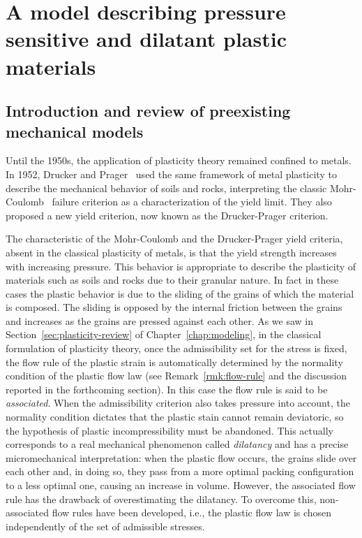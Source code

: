 \documentclass[a4paper,10pt,oneside]{amsbook}
\numberwithin{section}{chapter}
\numberwithin{equation}{chapter}
\theoremstyle{definition}
\begin{document}
\part{A model describing pressure sensitive and dilatant plastic materials}
\label{part:my-model}

\chapter{Introduction and review of preexisting mechanical models}
\label{chap:intro-pressure-sensitive}

Until the 1950s, the application of plasticity theory remained confined to metals. In 1952, Drucker and Prager~\cite{DruckerPrager1952} used the same framework of metal plasticity to describe the mechanical behavior of soils and rocks, interpreting the classic Mohr-Coulomb~\cite{Coulomb1776,Mohr1900} failure criterion as a characterization of the yield limit. They also proposed a new yield criterion, now known as the Drucker-Prager criterion.

The characteristic of the Mohr-Coulomb and the Drucker-Prager yield criteria, absent in the classical plasticity of metals, is that the yield strength increases with increasing pressure. This behavior is appropriate to describe the plasticity of materials such as soils and rocks due to their granular nature. In fact in these cases the plastic behavior is due to the sliding of the grains of which the material is composed. The sliding is opposed by the internal friction between the grains and increases as the grains are pressed against each other. As we saw in Section~\ref{sec:plasticity-review} of Chapter~\ref{chap:modeling}, in the classical formulation of plasticity theory, once the admissibility set for the stress is fixed, the flow rule of the plastic strain is automatically determined by the normality condition of the plastic flow law (see Remark~\ref{rmk:flow-rule} and the discussion reported in the forthcoming section). In this case the flow rule is said to be \emph{associated}. When the admissibility criterion also takes pressure into account, the normality condition dictates that the plastic stain cannot remain deviatoric, so the hypothesis of plastic incompressibility must be abandoned. This actually corresponds to a real mechanical phenomenon called \emph{dilatancy} and has a precise micromechanical interpretation: when the plastic flow occurs, the grains slide over each other and, in doing so, they pass from a more optimal packing configuration to a less optimal one, causing an increase in volume. However, the associated flow rule has the drawback of overestimating the dilatancy. To overcome this, non-associated flow rules have been developed, i.e., the plastic flow law is chosen independently of the set of admissible stresses.
\end{document}
